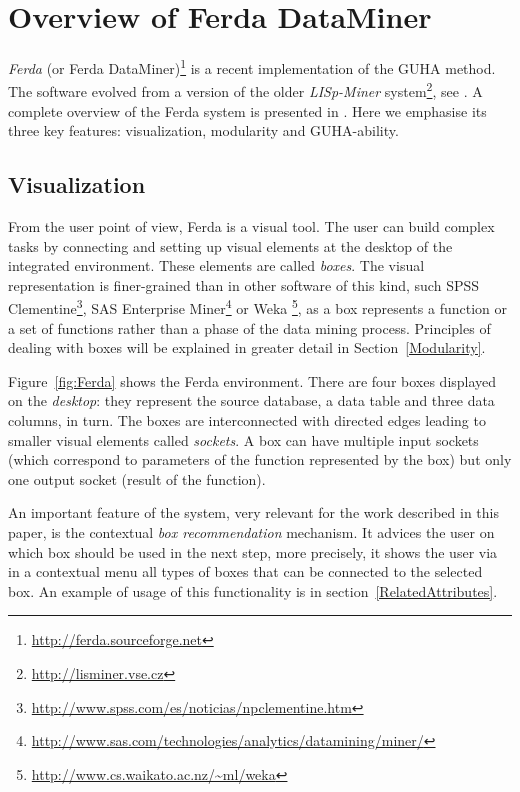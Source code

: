 \section{Overview of Ferda DataMiner} \label{Ferda}

\emph{Ferda} (or Ferda DataMiner)\footnote{\url{http://ferda.sourceforge.net}} is a recent implementation of the GUHA method. 
The software evolved from a version of the older \emph{LISp-Miner} system\footnote{\url{http://lisminer.vse.cz}}, see \cite{Alternative,Simunek}. 
A complete overview of the Ferda system is presented in \cite{Ferda}. 
Here we emphasise its three key features: visualization, modularity and GUHA-ability.

\subsection{Visualization}
From the user point of view, Ferda is a visual tool.
The user can build complex tasks by connecting and setting up visual elements at the desktop of the integrated environment. 
These elements are called \emph{boxes}. 
The visual representation is finer-grained than in other software of this kind, such SPSS Clementine\footnote{\url{http://www.spss.com/es/noticias/npclementine.htm}}, SAS Enterprise Miner\footnote{\url{http://www.sas.com/technologies/analytics/datamining/miner/}} or Weka \footnote{\url{http://www.cs.waikato.ac.nz/~ml/weka}}, as a box represents a function or a set of functions rather than a phase of the data mining process. 
Principles of dealing with boxes will be explained in greater detail in Section~\ref{Modularity}.

Figure~\ref{fig:Ferda} shows the Ferda environment. 
There are four boxes displayed on the \emph{desktop}: they represent the source database, a data table and three data columns, in turn. 
The boxes are interconnected with directed edges leading to smaller visual elements called \emph{sockets}. 
A box can have multiple input sockets (which correspond to parameters of the function represented by the box) but only one output socket (result of the function). 

An important feature of the system, very relevant for the work described in this paper, is the contextual \emph{box recommendation} mechanism. 
It advices the user on which box should be used in the next step, more precisely, it shows the user via in a contextual menu all types of boxes that can be connected to the selected box. 
An example of usage of this functionality is in section~\ref{RelatedAttributes}.

